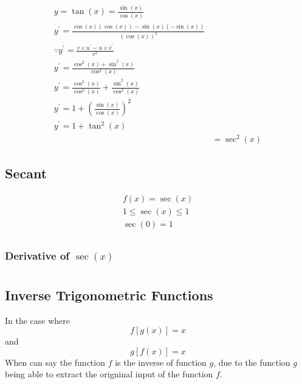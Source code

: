 \documentclass[12pt letter]{report}
\begin{document}
\begin{myproof}
	\begin{align*}
		y = \tan(x) = \frac{\sin(x)}{\cos(x)}                                       \\[20pt]
		y^{\prime} = \frac{\cos(x)(\cos(x))- \sin(x)(-\sin(x))}{(\cos(x))^2}        \\[20pt]
		\because y^{\prime} = \frac{v \times u^{\prime} - u \times v^{\prime}}{v^2} \\
		y^{\prime} = \frac{\cos^2(x) + \sin^2(x)}{\cos^2(x)}                        \\
		y^{\prime} = \frac{\cos^2(x)}{\cos^2(x)} + \frac{\sin^2(x)}{\cos^2(x)}      \\
		y^{\prime} = 1 + (\frac{\sin(x)}{\cos(x)})^2                                \\
		y^{\prime} = 1 + \tan^2(x)                                                  \\
		 & = \sec^2(x)
	\end{align*}
\end{myproof}

\section{Secant}

\begin{align*}
	f(x) = \sec(x)               \\
	1 \leq        \sec(x) \leq 1 \\
	\sec(0) = 1                  \\
\end{align*}

\subsection{Derivative of $\sec(x)$}

\chapter{}

\section{Inverse Trigonometric Functions}
In the case where
\[
	f[g(x)] = x
\] and
\[
	g[f(x)] = x
\]
When can say the function $f$ is the inverse of function $g$, due to the function $g$ being able to extract the origninal input of the function $f$.
\end{document}
